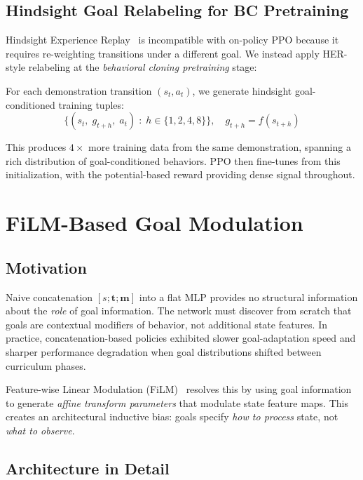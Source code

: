 \documentclass[11pt,a4paper]{article}
\begin{document}
\subsection{Hindsight Goal Relabeling for BC Pretraining}
\label{sec:her}

Hindsight Experience Replay~\cite{andrychowicz2017hindsight} is incompatible with on-policy PPO because it requires re-weighting transitions under a different goal.
We instead apply HER-style relabeling at the \emph{behavioral cloning pretraining} stage:

For each demonstration transition $(s_t, a_t)$, we generate hindsight goal-conditioned training tuples:
\begin{equation}
\{(s_t,\; g_{t+h},\; a_t) \;:\; h \in \{1, 2, 4, 8\}\}, \quad g_{t+h} = f(s_{t+h})
\end{equation}

This produces $4\times$ more training data from the same demonstration, spanning a rich distribution of goal-conditioned behaviors.
PPO then fine-tunes from this initialization, with the potential-based reward providing dense signal throughout.

\section{FiLM-Based Goal Modulation}
\label{sec:film}

\subsection{Motivation}

Naive concatenation $[s; \mathbf{t}; \mathbf{m}]$ into a flat MLP provides no structural information about the \emph{role} of goal information.
The network must discover from scratch that goals are contextual modifiers of behavior, not additional state features.
In practice, concatenation-based policies exhibited slower goal-adaptation speed and sharper performance degradation when goal distributions shifted between curriculum phases.

Feature-wise Linear Modulation (FiLM)~\cite{perez2018film} resolves this by using goal information to generate \emph{affine transform parameters} that modulate state feature maps.
This creates an architectural inductive bias: goals specify \emph{how to process} state, not \emph{what to observe}.

\subsection{Architecture in Detail}
\label{sec:film-arch}
\end{document}

